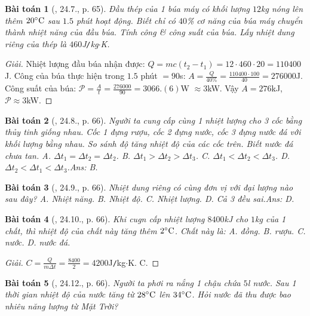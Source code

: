 \documentclass{article}
\newtheorem{baitoan}{Bài toán}
\begin{document}
\begin{baitoan}[\cite{SBT_Vat_Ly_8}, 24.7., p. 65]
	Đầu thép của 1 búa máy có khối lượng $12$\emph{kg} nóng lên thêm $20^\circ{\rm C}$ sau $1.5$ phút hoạt động. Biết chỉ có $40$\% cơ năng của búa máy chuyển thành nhiệt năng của đầu búa. Tính công \& công suất của búa. Lấy nhiệt dung riêng của thép là $460$\emph{J\texttt{/}kg$\cdot$K}.
\end{baitoan}

\begin{proof}[Giải]
	Nhiệt lượng đầu búa nhận được: $Q = mc(t_2 - t_1) = 12\cdot460\cdot20 = 110400$J. Công của búa thực hiện trong $1.5$ phút $= 90$s: $A = \frac{Q}{40\%} = \frac{110400\cdot100}{40} = 276000$J. Công suất của búa: $\mathcal{P} = \frac{A}{t} = \frac{276000}{90} = 3066.(6)$W $\approx3$kW. Vậy $A = 276$kJ, $\mathcal{P}\approx3$kW.
\end{proof}

\begin{baitoan}[\cite{SBT_Vat_Ly_8}, 24.8., p. 66]
	Người ta cung cấp cùng 1 nhiệt lượng cho 3 cốc bằng thủy tinh giống nhau. Cốc 1 đựng rượu, cốc 2 đựng nước, cốc 3 đựng nước đá với khối lượng bằng nhau. So sánh độ tăng nhiệt độ của các cốc trên. Biết nước đá chưa tan. {\sf A.} $\Delta t_1 = \Delta t_2 = \Delta t_2$. {\sf B.} $\Delta t_1 > \Delta t_2 > \Delta t_3$. {\sf C.} $\Delta t_1 < \Delta t_2 < \Delta t_3$. {\sf D.} $\Delta t_2 < \Delta t_1 < \Delta t_3$.\hfill{\sf Ans: B.}
\end{baitoan}

\begin{baitoan}[\cite{SBT_Vat_Ly_8}, 24.9., p. 66]
	Nhiệt dung riêng có cùng đơn vị với đại lượng nào sau đây? {\sf A.} Nhiệt năng. {\sf B.} Nhiệt độ. {\sf C.} Nhiệt lượng. {\sf D.} Cả 3 đều sai.\hfill{\sf Ans: D.}
\end{baitoan}

\begin{baitoan}[\cite{SBT_Vat_Ly_8}, 24.10., p. 66]
	Khi cugn cấp nhiệt lượng $8400$\emph{kJ} cho $1$\emph{kg} của 1 chất, thì nhiệt độ của chất này tăng thêm $2^\circ{\rm C}$. Chất này là: {\sf A.} đồng. {\sf B.} rượu. {\sf C.} nước. {\sf D.} nước đá.
\end{baitoan}

\begin{proof}[Giải]
	$C = \frac{Q}{m\Delta t} = \frac{8400}{2} = 4200$J\texttt{/}kg$\cdot$K. {\sf C.}
\end{proof}

\begin{baitoan}[\cite{SBT_Vat_Ly_8}, 24.12., p. 66]
	Người ta phơi ra nắng 1 chậu chứa $5$\emph{l} nước. Sau 1 thời gian nhiệt độ của nước tăng từ $28^\circ{\rm C}$ lên $34^\circ{\rm C}$. Hỏi nước đã thu được bao nhiêu năng lượng từ Mặt Trời?
\end{baitoan}
\end{document}
